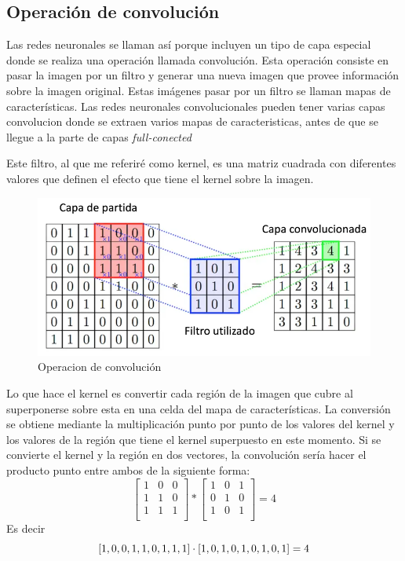 \documentclass[14pt,a4paper]{report}
\begin{document}
\subsection*{Operación de convolución}

Las redes neuronales se llaman así porque incluyen un tipo de capa especial donde se realiza una operación llamada convolución. Esta operación consiste en pasar la imagen por un filtro y generar una nueva imagen que provee información sobre la imagen original. Estas imágenes pasar por un filtro se llaman mapas de características. Las redes neuronales convolucionales pueden tener varias capas convolucion donde se extraen varios mapas de caracteristicas, antes de que se llegue a la parte de capas \textit{full-conected}

Este filtro, al que me referiré como kernel, es una matriz cuadrada con diferentes valores que definen el efecto que tiene el kernel sobre la imagen.

\begin{figure}[h]
  \centering
\includegraphics[scale=0.7]{../convolucion.png} 
  \caption{Operacion de convolución}
  \label{fig:neural-network}
\end{figure}

Lo que hace el kernel es convertir cada región de la imagen que cubre al superponerse sobre esta en una celda del mapa de características. La conversión se obtiene mediante la multiplicación punto por punto de los valores del kernel y los valores de la región que tiene el kernel superpuesto en este momento. Si se convierte el kernel y la región en dos vectores, la convolución sería hacer el producto punto entre ambos de la siguiente forma:
$$
\begin{bmatrix}
1 & 0 & 0 \\
1 & 1 & 0 \\
1 & 1 & 1 \\
\end{bmatrix}
*
\begin{bmatrix}
1 & 0 & 1 \\
0 & 1 & 0 \\
1 & 0 & 1 \\
\end{bmatrix}
=
4
$$
Es decir
$$
[1, 0, 0, 1, 1, 0, 1, 1, 1]\cdot[1, 0, 1, 0, 1, 0, 1, 0, 1]=4\\
$$
\end{document}

